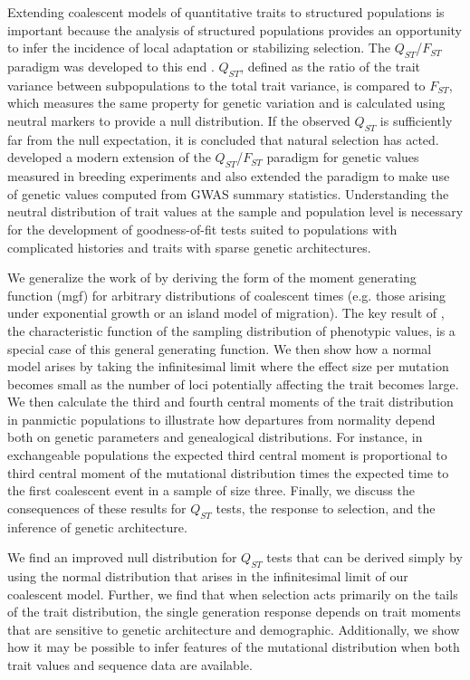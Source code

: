 Extending coalescent models of quantitative traits to structured populations is
important because the analysis of structured populations provides an opportunity
to infer the incidence of local adaptation or stabilizing selection. The
$Q_{ST}$/$F_{ST}$ paradigm was developed to this end
\citep{Whitlock2008,Spitze1993}. $Q_{ST}$, defined as the ratio of the trait
variance between subpopulations to the total trait variance, is compared to
$F_{ST}$, which measures the same property for genetic variation and is
calculated using neutral markers to provide a null distribution. If the observed
$Q_{ST}$ is sufficiently far from the null expectation, it is concluded that
natural selection has acted. \citet{Ovaskainen2011} developed a modern extension
of the $Q_{ST}$/$F_{ST}$ paradigm for genetic values measured in breeding
experiments and \citet{Berg2014} also extended the paradigm to make use of
genetic values computed from GWAS summary statistics. Understanding the neutral
distribution of trait values at the sample and population level is necessary for
the development of goodness-of-fit tests suited to populations with complicated
histories and traits with sparse genetic architectures.

We generalize the work of \citet{Schraiber2015} by deriving the form of the
moment generating function (mgf) for arbitrary distributions of coalescent times
(e.g. those arising under exponential growth or an island model of migration).
The key result of \citet{Schraiber2015}, the characteristic function of the
sampling distribution of phenotypic values, is a special case of this general
generating function. We then show how a normal model arises by taking the
infinitesimal limit where the effect size per mutation becomes small as the
number of loci potentially affecting the trait becomes large. We then calculate
the third and fourth central moments of the trait distribution in panmictic
populations to illustrate how departures from normality depend both on genetic
parameters and genealogical distributions. For instance, in exchangeable
populations the expected third central moment is proportional to third central
moment of the mutational distribution times the expected time to the first
coalescent event in a sample of size three. Finally, we discuss the consequences
of these results for $Q_{ST}$ tests, the response to selection, and the
inference of genetic architecture.

We find an improved null distribution for $Q_{ST}$ tests that can be derived
simply by using the normal distribution that arises in the infinitesimal limit
of our coalescent model. Further, we find that when selection acts primarily on
the tails of the trait distribution, the single generation response depends on
trait moments that are sensitive to genetic architecture and demographic.
Additionally, we show how it may be possible to infer features of the mutational
distribution when both trait values and sequence data are available.

